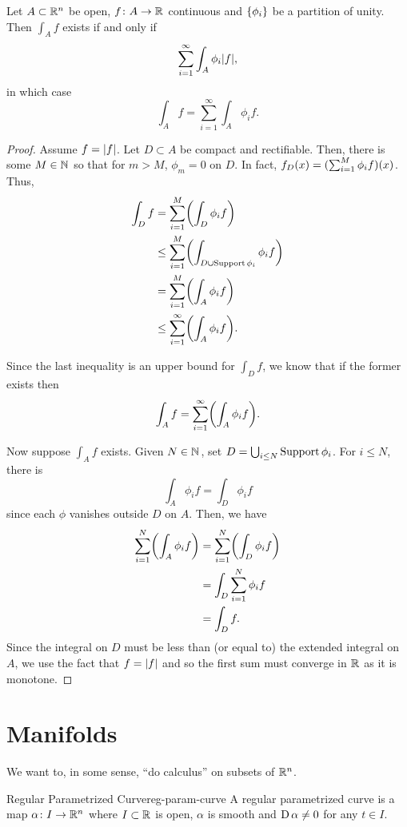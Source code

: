 \documentclass{article}
\begin{document}
\begin{theorem}{}{}
  Let $A \subset \RR[n]$ be open, $f \from A \to \RR$ continuous and $\set{\phi_{i}}$ be a partition of unity.
  Then $\int_{A}f$ exists if and only if
  \[ \sum_{i = 1}^{\infty}\int_{A}\phi_{i}\abs{f}, \]
  in which case
  \[ \int_{A}f = \sum_{i = 1}^{\infty}\int_{A}\phi_{i}f. \]
\end{theorem}
\begin{proof}
  Assume $f = \abs{f}$. Let $D \subset A$ be compact and rectifiable.
  Then, there is some $M \in \NN$ so that for $m > M$, $\phi_{m} = 0$  on $D$.
  In fact, $f_{D}(x) = \pars{\sum_{i = 1}^{M}\phi_{i}f}(x)$.
  Thus,
  \begin{align*}
    \int_{D}f &= \sum_{i = 1}^{M}\pars*{\int_{D}\phi_{i}f}\\
    &\le \sum_{i = 1}^{M}\pars*{\int_{D \cup \Support \phi_{i}} \phi_{i}f}\\
    &= \sum_{i = 1}^{M}\pars*{\int_{A}\phi_{i}f}\\
    &\le \sum_{i = 1}^{\infty}\pars*{\int_{A}\phi_{i}f}.
  \end{align*}

  Since the last inequality is an upper bound for $\int_{D}f$, we know that if the former exists then
  \[ \int_{A}f = \sum_{i = 1}^{\infty}\pars*{\int_{A}\phi_{i}f}. \]

  Now suppose $\int_{A}f$ exists. Given $N \in \NN$, set $D = \bigcup_{i \le N} \Support \phi_{i}$.
  For $i \le N$, there is
  \[ \int_{A}\phi_{i}f = \int_{D}\phi_{i}f \]
  since each $\phi$ vanishes outside $D$ on $A$. Then, we have
  \begin{align*}
    \sum_{i = 1}^{N}\pars*{\int_{A}\phi_{i}f} &= \sum_{i = 1}^{N}\pars*{\int_{D}\phi_{i}f}\\
    &= \int_{D}\sum_{i = 1}^{N}\phi_{i}f\\
    &= \int_{D}f.
  \end{align*}
  Since the integral on $D$ must be less than (or equal to) the extended integral on $A$,
  we use the fact that $f = \abs{f}$ and so the first sum must converge in $\RR$ as it is monotone.
\end{proof}

\section{Manifolds}

We want to, in some sense, ``do calculus'' on subsets of $\RR[n]$.

\begin{definition}{Regular Parametrized Curve}{reg-param-curve}
  A regular parametrized curve is a map $\alpha \from I \to \RR[n]$ where
  $I \subset \RR$ is open, $\alpha$ is smooth and $\D\alpha \ne 0$ for any $t \in I$.
\end{definition}
\end{document}
